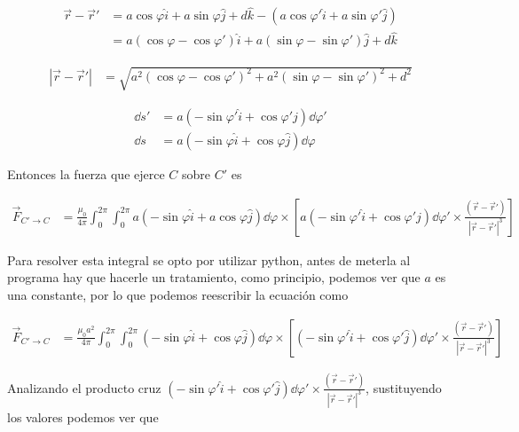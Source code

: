 \documentclass[11pt]{report}
\theoremstyle{plain}
\theoremstyle{definition}
\begin{document}
	\begin{align*}%
		\vec{r} - \vec{r}' &= a\cos\varphi\hat{i} + a\sin\varphi\hat{j}+d\hat{k} - (a\cos\varphi'\hat{i} + a\sin\varphi'\hat{j})\\
		&= a(\cos\varphi-\cos\varphi')\hat{i} + a(\sin\varphi-\sin\varphi')\hat{j} + d\hat{k}
	\end{align*}
	
	\begin{align*}%
		|\vec{r} - \vec{r}'| &= \sqrt{a^2(\cos\varphi-\cos\varphi')^2 + a^2(\sin\varphi-\sin\varphi')^2 + d^2}
	\end{align*}
	
	\begin{align*}%
		\dd{s'} &= a \left(-\sin\varphi'\hat{i} + \cos\varphi'\hat{j}\right)\dd{\varphi'}\\
		\dd{s} &= a \left(-\sin\varphi\hat{i} + \cos\varphi\hat{j}\right)\dd{\varphi}
	\end{align*}
	
	Entonces la fuerza que ejerce $C$ sobre $C'$ es

	\begin{align*}%
		\vec{F}_{C'\rightarrow C}&= \frac{\mu_0}{4\pi}\int_0^{2\pi}\int_0^{2\pi} a \left(-\sin\varphi\hat{i} + a\cos\varphi\hat{j}\right)\dd{\varphi} \times \left[ a \left(-\sin\varphi'\hat{i} + \cos\varphi'\hat{j}\right)\dd{\varphi'} \times \frac{(\vec{r} - \vec{r}')}{|\vec{r} - \vec{r}'|^3}\right]
	\end{align*}
	
	
	Para resolver esta integral se opto por utilizar python, antes de meterla al programa hay que hacerle un tratamiento, como principio, podemos ver que $a$ es una constante, por lo que podemos reescribir la ecuación como
	
	\begin{align*}%
		\vec{F}_{C'\rightarrow C}&= \frac{\mu_0a^2}{4\pi}\int_0^{2\pi}\int_0^{2\pi}\left(-\sin\varphi\hat{i} + \cos\varphi\hat{j}\right)\dd{\varphi} \times \left[  \left(-\sin\varphi'\hat{i} + \cos\varphi'\hat{j}\right)\dd{\varphi'} \times \frac{(\vec{r} - \vec{r}')}{|\vec{r} - \vec{r}'|^3}\right]
	\end{align*}

	Analizando el producto cruz $\left(-\sin\varphi'\hat{i} + \cos\varphi'\hat{j}\right)\dd{\varphi'} \times \frac{(\vec{r} - \vec{r}')}{|\vec{r} - \vec{r}'|^3}$, sustituyendo los valores podemos ver que
	
\end{document}
